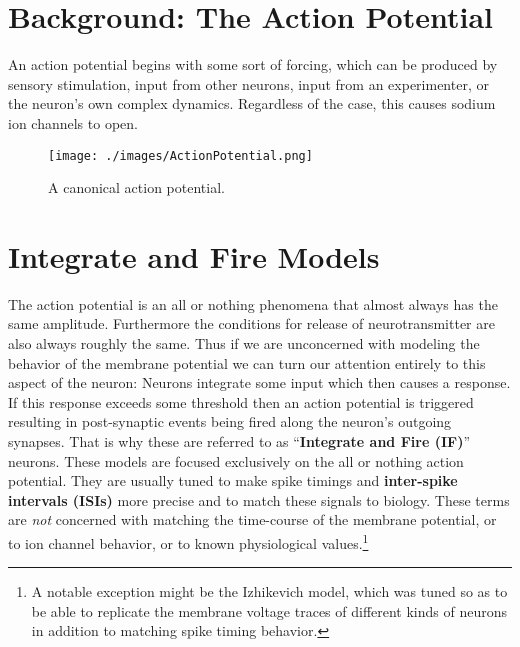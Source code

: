 \section{Background: The Action Potential}

An action potential begins with some sort of forcing, which can be produced by sensory stimulation, input from other neurons, input from an experimenter, or the neuron's own complex dynamics. Regardless of the case, this causes sodium ion channels to open.

\begin{figure}[h]
	\centering
	\texttt{[image: ./images/ActionPotential.png]}
	\caption[Simbrain screenshot]{A canonical action potential.}
	\label{ActPot}
\end{figure}


\section{Integrate and Fire Models}

The action potential is an all or nothing phenomena that almost always has the same amplitude. Furthermore the conditions for release of neurotransmitter are also always roughly the same. Thus if we are unconcerned with modeling the behavior of the membrane potential we can turn our attention entirely to this aspect of the neuron: Neurons integrate some input which then causes a response. If this response exceeds some threshold then an action potential is triggered resulting in post-synaptic events being fired along the neuron's outgoing synapses. That is why these are referred to as ``\textbf{Integrate and Fire (IF)}'' neurons. These models are focused exclusively on the all or nothing action potential. They are usually tuned to make spike timings and \textbf{inter-spike intervals (ISIs)} more precise and to match these signals to biology. These terms are \emph{not} concerned with matching the time-course of the membrane potential, or to ion channel behavior, or to known physiological values.\footnote{A notable exception might be the Izhikevich model, which was tuned so as to be able to replicate the membrane voltage traces of different kinds of neurons in addition to matching spike timing behavior.}


